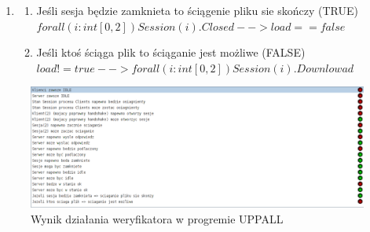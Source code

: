 \documentclass{article}
\begin{document}
\begin{enumerate}
\begin{enumerate}
				\end{enumerate}
				
			\item
				
				\begin{enumerate}
				
					\item Jeśli sesja będzie zamknieta to ściągenie pliku sie skończy (TRUE) \\ $ forall (i:int[0,2]) Session(i).Closed --> load==false $
					\item Jeśli ktoś ściąga plik to ściąganie jest możliwe (FALSE) \\ $ load!=true --> forall (i:int[0,2]) Session(i).Downlowad $
				
				\end{enumerate}
			
		\end{enumerate}
		
		\begin{figure}[h]
			\includegraphics[width=\textwidth,angle=90]{lab23/verifier}
			\caption{Wynik działania weryfikatora w progremie UPPALL}
		\end{figure}
		
			
\end{document}
